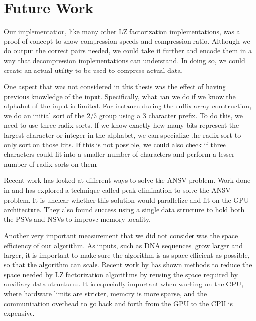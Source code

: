 \chapter{Future Work}
\label{chap:futurework}

Our implementation, like many other LZ factorization implementations, was a proof of concept to show compression speeds and compression ratio.
Although we do output the correct pairs needed, we could take it further and encode them in a way that decompression implementations can understand.
In doing so, we could create an actual utility to be used to compress actual data.

One aspect that was not considered in this thesis was the effect of having previous knowledge of the input.
Specifically, what can we do if we know the alphabet of the input is limited.
For instance during the suffix array construction, we do an initial sort of the 2/3 group using a 3 character prefix.
To do this, we need to use three radix sorts.
If we know exactly how many bits represent the largest character or integer in the alphabet, we can specialize the radix sort to only sort on those bits.
If this is not possible, we could also check if three characters could fit into a smaller number of characters and perform a lesser number of radix sorts on them.

Recent work has looked at different ways to solve the ANSV problem.
Work done in \cite{Computing longest previous factor in linear time and applications} and \cite{Simpler and Faster Lempel Ziv Factorization} has explored a technique called peak elimination to solve the ANSV problem.
It is unclear whether this solution would parallelize and fit on the GPU architecture.
They also found success using a single data structure to hold both the PSVs and NSVs to improve memory locality.

Another very important measurement that we did not consider was the space efficiency of our algorithm.
As inputs, such as DNA sequences, grow larger and larger, it is important to make sure the algorithm is as space efficient as possible, so that the algorithm can scale.
Recent work by \cite{Space Efﬁcient Linear Time Lempel-Ziv Factorization on Constant Size Alphabets} has shown methods to reduce the space needed by LZ factorization algorithms by reusing the space required by auxiliary data structures.
It is especially important when working on the GPU, where hardware limits are stricter, memory is more sparse, and the communication overhead to go back and forth from the GPU to the CPU is expensive.

